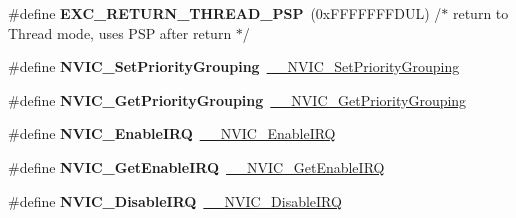 \begin{DoxyCompactItemize}
\item 
\mbox{\label{group___c_m_s_i_s___core___n_v_i_c_functions_ga9998daf0fbdf31dbc8f81cd604b58175}} 
\#define {\bfseries E\+X\+C\+\_\+\+R\+E\+T\+U\+R\+N\+\_\+\+T\+H\+R\+E\+A\+D\+\_\+\+P\+SP}~(0x\+F\+F\+F\+F\+F\+F\+F\+D\+U\+L)     /$\ast$ return to Thread mode, uses P\+S\+P after return                                $\ast$/
\item 
\mbox{\label{group___c_m_s_i_s___core___n_v_i_c_functions_ga0e798d5aec68cdd8263db86a76df788f}} 
\#define {\bfseries N\+V\+I\+C\+\_\+\+Set\+Priority\+Grouping}~\hyperlink{group___c_m_s_i_s___core___n_v_i_c_functions_gafc94dcbaee03e4746ade1f5bb9aaa56d}{\+\_\+\+\_\+\+N\+V\+I\+C\+\_\+\+Set\+Priority\+Grouping}
\item 
\mbox{\label{group___c_m_s_i_s___core___n_v_i_c_functions_ga4eeb9214f2264fc23c34ad5de2d3fa11}} 
\#define {\bfseries N\+V\+I\+C\+\_\+\+Get\+Priority\+Grouping}~\hyperlink{group___c_m_s_i_s___core___n_v_i_c_functions_ga9b894af672df4373eb637f8288845c05}{\+\_\+\+\_\+\+N\+V\+I\+C\+\_\+\+Get\+Priority\+Grouping}
\item 
\mbox{\label{group___c_m_s_i_s___core___n_v_i_c_functions_ga57b3064413dbc7459d9646020fdd8bef}} 
\#define {\bfseries N\+V\+I\+C\+\_\+\+Enable\+I\+RQ}~\hyperlink{group___c_m_s_i_s___core___n_v_i_c_functions_ga71227e1376cde11eda03fcb62f1b33ea}{\+\_\+\+\_\+\+N\+V\+I\+C\+\_\+\+Enable\+I\+RQ}
\item 
\mbox{\label{group___c_m_s_i_s___core___n_v_i_c_functions_ga857de13232ec65dd15087eaa15bc4a69}} 
\#define {\bfseries N\+V\+I\+C\+\_\+\+Get\+Enable\+I\+RQ}~\hyperlink{group___c_m_s_i_s___core___n_v_i_c_functions_gaaeb5e7cc0eaad4e2817272e7bf742083}{\+\_\+\+\_\+\+N\+V\+I\+C\+\_\+\+Get\+Enable\+I\+RQ}
\item 
\mbox{\label{group___c_m_s_i_s___core___n_v_i_c_functions_ga73b4e251f59cab4e9a5e234aac02ae57}} 
\#define {\bfseries N\+V\+I\+C\+\_\+\+Disable\+I\+RQ}~\hyperlink{group___c_m_s_i_s___core___n_v_i_c_functions_gae016e4c1986312044ee768806537d52f}{\+\_\+\+\_\+\+N\+V\+I\+C\+\_\+\+Disable\+I\+RQ}

\end{DoxyCompactItemize}
